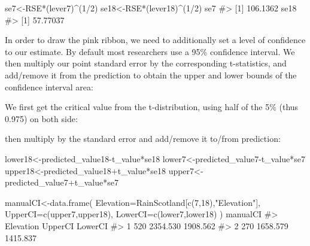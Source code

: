 \documentclass[
  letterpaper,
  DIV=11,
  numbers=noendperiod]{scrreprt}
\newenvironment{Shaded}{\begin{snugshade}}{\end{snugshade}}
\newcommand{\AttributeTok}[1]{\textcolor[rgb]{0.40,0.45,0.13}{#1}}
\newcommand{\CommentTok}[1]{\textcolor[rgb]{0.37,0.37,0.37}{#1}}
\newcommand{\DecValTok}[1]{\textcolor[rgb]{0.68,0.00,0.00}{#1}}
\newcommand{\FloatTok}[1]{\textcolor[rgb]{0.68,0.00,0.00}{#1}}
\newcommand{\FunctionTok}[1]{\textcolor[rgb]{0.28,0.35,0.67}{#1}}
\newcommand{\NormalTok}[1]{\textcolor[rgb]{0.00,0.23,0.31}{#1}}
\newcommand{\OtherTok}[1]{\textcolor[rgb]{0.00,0.23,0.31}{#1}}
\newcommand{\SpecialCharTok}[1]{\textcolor[rgb]{0.37,0.37,0.37}{#1}}
\newcommand{\StringTok}[1]{\textcolor[rgb]{0.13,0.47,0.30}{#1}}
\begin{document}
\begin{Shaded}
\begin{Highlighting}[]
\NormalTok{se7}\OtherTok{\textless{}{-}}\NormalTok{RSE}\SpecialCharTok{*}\NormalTok{(lever7)}\SpecialCharTok{\^{}}\NormalTok{(}\DecValTok{1}\SpecialCharTok{/}\DecValTok{2}\NormalTok{)}
\NormalTok{se18}\OtherTok{\textless{}{-}}\NormalTok{RSE}\SpecialCharTok{*}\NormalTok{(lever18)}\SpecialCharTok{\^{}}\NormalTok{(}\DecValTok{1}\SpecialCharTok{/}\DecValTok{2}\NormalTok{)}
\NormalTok{se7}
\CommentTok{\#\textgreater{} [1] 106.1362}
\NormalTok{se18}
\CommentTok{\#\textgreater{} [1] 57.77037}
\end{Highlighting}
\end{Shaded}

In order to draw the pink ribbon, we need to additionally set a level of
confidence to our estimate. By default most researchers use a 95\%
confidence interval. We then multiply our point standard error by the
corresponding t-statistics, and add/remove it from the prediction to
obtain the upper and lower bounds of the confidence interval area:

We first get the critical value from the t-distribution, using half of
the 5\% (thus 0.975) on both side:

\begin{Shaded}
\end{Shaded}

then multiply by the standard error and add/remove it to/from
prediction:

\begin{Shaded}
\begin{Highlighting}[]
\NormalTok{lower18}\OtherTok{\textless{}{-}}\NormalTok{predicted\_value18}\SpecialCharTok{{-}}\NormalTok{t\_value}\SpecialCharTok{*}\NormalTok{se18}
\NormalTok{lower7}\OtherTok{\textless{}{-}}\NormalTok{predicted\_value7}\SpecialCharTok{{-}}\NormalTok{t\_value}\SpecialCharTok{*}\NormalTok{se7}
\NormalTok{upper18}\OtherTok{\textless{}{-}}\NormalTok{predicted\_value18}\SpecialCharTok{+}\NormalTok{t\_value}\SpecialCharTok{*}\NormalTok{se18}
\NormalTok{upper7}\OtherTok{\textless{}{-}}\NormalTok{predicted\_value7}\SpecialCharTok{+}\NormalTok{t\_value}\SpecialCharTok{*}\NormalTok{se7}

\NormalTok{manualCI}\OtherTok{\textless{}{-}}\FunctionTok{data.frame}\NormalTok{(}
  \AttributeTok{Elevation=}\NormalTok{RainScotland[}\FunctionTok{c}\NormalTok{(}\DecValTok{7}\NormalTok{,}\DecValTok{18}\NormalTok{),}\StringTok{"Elevation"}\NormalTok{],}
  \AttributeTok{UpperCI=}\FunctionTok{c}\NormalTok{(upper7,upper18),}
  \AttributeTok{LowerCI=}\FunctionTok{c}\NormalTok{(lower7,lower18)}
\NormalTok{  )}
\NormalTok{manualCI}
\CommentTok{\#\textgreater{}   Elevation  UpperCI  LowerCI}
\CommentTok{\#\textgreater{} 1       520 2354.530 1908.562}
\CommentTok{\#\textgreater{} 2       270 1658.579 1415.837}
\end{Highlighting}
\end{Shaded}
\end{document}
